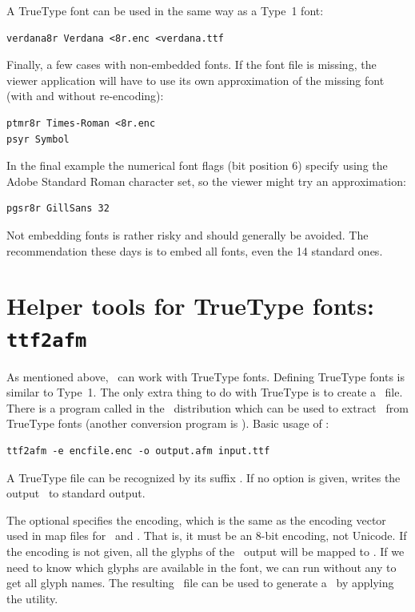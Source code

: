 \documentclass{pdftexmanual}
\begin{document}
A TrueType font can be used in the same way as a Type~1 font:

\begin{verbatim}
verdana8r Verdana <8r.enc <verdana.ttf
\end{verbatim}

Finally, a few cases with non-embedded fonts. If the font file is
missing, the viewer application will have to use its own approximation
of the missing font (with and without re-encoding):

\begin{verbatim}
ptmr8r Times-Roman <8r.enc
psyr Symbol
\end{verbatim}

In the final example the numerical font flags (bit position 6) specify
using the Adobe Standard Roman character set, so the viewer might try an
approximation:

\begin{verbatim}
pgsr8r GillSans 32
\end{verbatim}

Not embedding fonts is rather risky and should generally be avoided. The
recommendation these days is to embed all fonts, even the 14 standard
ones.

\section{Helper tools for TrueType fonts: \texttt{ttf2afm}}

As mentioned above, \PDFTEX\ can work with TrueType fonts. Defining
TrueType fonts is similar to Type~1. The only extra thing to do with
TrueType is to create a \TFM\ file. There is a program called
 in the \PDFTEX\ distribution which can be used to extract
\AFM\ from TrueType fonts (another conversion program is
). Basic usage of :

\begin{verbatim}
ttf2afm -e encfile.enc -o output.afm input.ttf
\end{verbatim}

A TrueType file can be recognized by its suffix .
If no  option is given,  writes the output \AFM\
to standard output. 

The optional  specifies the encoding, which is the same
as the encoding vector used in map files for \PDFTEX\ and \type{dvips}.
That is, it must be an 8-bit encoding, not Unicode. If the encoding is
not given, all the glyphs of the \AFM\ output will be mapped to
. If we need to know which glyphs are available in the
font, we can run \type{ttf2afm} without any \type{-e} to get all glyph
names. The resulting \AFM\ file can be used to generate a \TFM\ by
applying the \filename {afm2tfm} utility.
\end{document}
